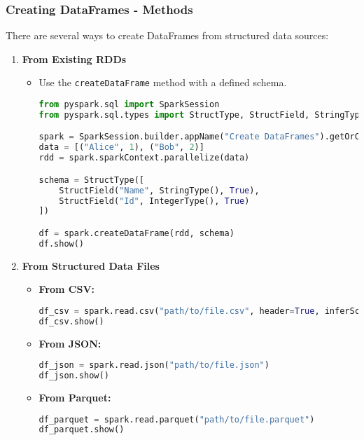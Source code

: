 \documentclass[aspectratio=169]{beamer}
\begin{document}
\begin{frame}[fragile]
    \frametitle{Creating DataFrames - Methods}
    There are several ways to create DataFrames from structured data sources:
    
    \begin{enumerate}
        \item \textbf{From Existing RDDs}
        \begin{itemize}
            \item Use the \texttt{createDataFrame} method with a defined schema.
            \begin{lstlisting}[language=Python]
from pyspark.sql import SparkSession
from pyspark.sql.types import StructType, StructField, StringType, IntegerType

spark = SparkSession.builder.appName("Create DataFrames").getOrCreate()
data = [("Alice", 1), ("Bob", 2)]
rdd = spark.sparkContext.parallelize(data)

schema = StructType([
    StructField("Name", StringType(), True),
    StructField("Id", IntegerType(), True)
])

df = spark.createDataFrame(rdd, schema)
df.show()
            \end{lstlisting}
        \end{itemize}
        
        \item \textbf{From Structured Data Files}
        \begin{itemize}
            \item \textbf{From CSV:}
            \begin{lstlisting}[language=Python]
df_csv = spark.read.csv("path/to/file.csv", header=True, inferSchema=True)
df_csv.show()
            \end{lstlisting}
            \item \textbf{From JSON:}
            \begin{lstlisting}[language=Python]
df_json = spark.read.json("path/to/file.json")
df_json.show()
            \end{lstlisting}
            \item \textbf{From Parquet:}
            \begin{lstlisting}[language=Python]
df_parquet = spark.read.parquet("path/to/file.parquet")
df_parquet.show()
            \end{lstlisting}
        \end{itemize}
    \end{enumerate}
\end{frame}
\end{document}
